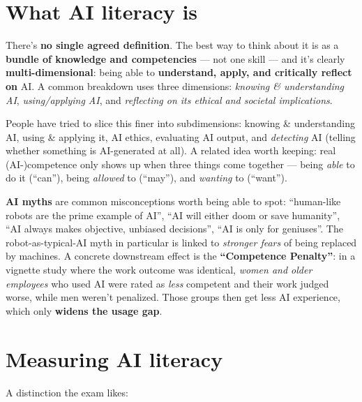 \documentclass[11pt, oneside]{book}
\begin{document}
\section{What AI literacy is}

\begin{defbox}[title={AI literacy}]
There's \textbf{no single agreed definition}. The best way to think about it
is as a \textbf{bundle of knowledge and competencies} — not one skill — and
it's clearly \textbf{multi-dimensional}: being able to \textbf{understand,
apply, and critically reflect on} AI. A common breakdown uses three
dimensions: \emph{knowing \& understanding AI}, \emph{using/applying AI}, and
\emph{reflecting on its ethical and societal implications}.
\end{defbox}

People have tried to slice this finer into subdimensions: knowing \&
understanding AI, using \& applying it, AI ethics, evaluating AI output, and
\emph{detecting} AI (telling whether something is AI-generated at all). A
related idea worth keeping: real (AI-)competence only shows up when three
things come together — being \emph{able} to do it (``can''), being
\emph{allowed} to (``may''), and \emph{wanting} to (``want'').

\textbf{AI myths} are common misconceptions worth being able to spot:
``human-like robots are the prime example of AI'', ``AI will either doom or
save humanity'', ``AI always makes objective, unbiased decisions'', ``AI is
only for geniuses''. The robot-as-typical-AI myth in particular is linked to
\emph{stronger fears} of being replaced by machines. A concrete downstream
effect is the \textbf{``Competence Penalty''}: in a vignette study where the
work outcome was identical, \emph{women and older employees} who used AI were
rated as \emph{less} competent and their work judged worse, while men weren't
penalized. Those groups then get less AI experience, which only \textbf{widens
the usage gap}.

\section{Measuring AI literacy}

A distinction the exam likes:
\end{document}
